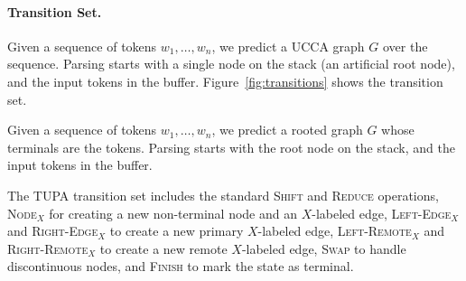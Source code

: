 \documentclass[11pt,a4paper]{article}
\begin{document}
\paragraph{Transition Set.}
Given a sequence of tokens $w_1, \ldots, w_n$, we predict a UCCA graph $G$ over the sequence.
Parsing starts with a single node on the stack (an artificial root node), and the input tokens
in the buffer. Figure~\ref{fig:transitions} shows the transition set.


Given a sequence of tokens $w_1, \ldots, w_n$,
we predict a rooted graph $G$ whose terminals are the tokens.
Parsing starts with the root node on the stack,
and the input tokens in the buffer.

The TUPA transition set includes
the standard \textsc{Shift} and \textsc{Reduce} operations,
\textsc{Node$_X$} for creating a new non-terminal node and an $X$-labeled edge,
\textsc{Left-Edge$_X$} and \textsc{Right-Edge$_X$} to create a new primary $X$-labeled edge,
\textsc{Left-Remote$_X$} and \textsc{Right-Remote$_X$} to create a new remote $X$-labeled edge,
\textsc{Swap} to handle discontinuous nodes,
and \textsc{Finish} to mark the state as terminal.
\end{document}
